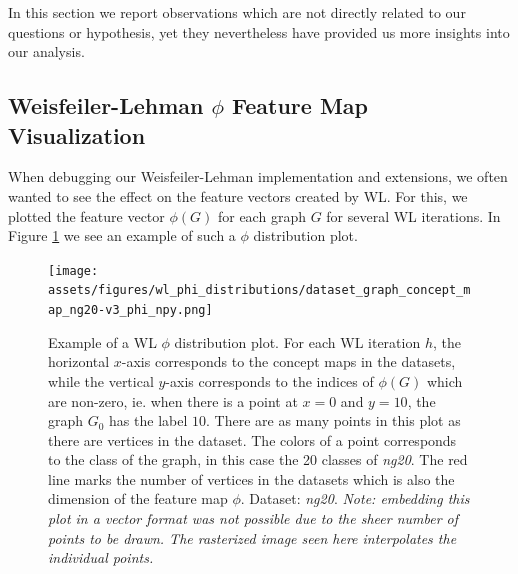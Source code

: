 
In this section we report observations which are not directly related to our questions or hypothesis, yet they nevertheless have provided us more insights into our analysis.

\subsection{Weisfeiler-Lehman $\phi$ Feature Map Visualization}
When debugging our Weisfeiler-Lehman implementation and extensions, we often wanted to see the effect on the feature vectors created by WL.
For this, we plotted the feature vector $\phi(G)$ for each graph $G$ for several WL iterations.
In Figure \ref{fig:phi_distribution_example} we see an example of such a $\phi$ distribution plot.

\begin{figure}[htb!]
	\centering
	{\texttt{[image: assets/figures/wl\_phi\_distributions/dataset\_graph\_concept\_map\_ng20-v3\_phi\_npy.png]}
		\caption[Example: $\phi$ distribution plot]{%
			Example of a WL $\phi$ distribution plot.
			For each WL iteration $h$, the horizontal $x$-axis corresponds to the concept maps in the datasets, while the vertical $y$-axis corresponds to the indices of $\phi(G)$ which are non-zero, ie. when there is a point at $x=0$ and $y=10$, the graph $G_0$ has the label $10$.
			There are as many points in this plot as there are vertices in the dataset.
			The colors of a point corresponds to the class of the graph, in this case the 20 classes of \textit{ng20}.
			The red line marks the number of vertices in the datasets which is also the dimension of the feature map $\phi$.
			Dataset: \textit{ng20}.
			\textit{Note: embedding this plot in a vector format  was not possible due to the sheer number of points to be drawn. The rasterized image seen here interpolates the individual points.}
		}%
		\label{fig:phi_distribution_example}}
\end{figure}

